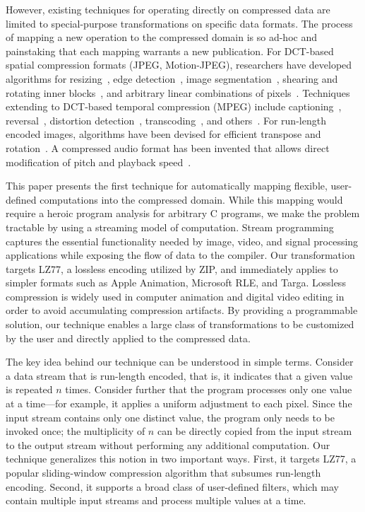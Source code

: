 However, existing techniques for operating directly on compressed data
are limited to special-purpose transformations on specific data
formats.  The process of mapping a new operation to the compressed
domain is so ad-hoc and painstaking that each mapping warrants a new
publication.  For DCT-based spatial compression formats (JPEG,
Motion-JPEG), researchers have developed algorithms for
resizing~\cite{dugad01,mukherjee02}, edge
detection~\cite{shen96,shen96b}, image segmentation~\cite{feng03},
shearing and rotating inner blocks~\cite{shen98}, and arbitrary linear
combinations of pixels~\cite{smith96b}.  Techniques extending to
DCT-based temporal compression (MPEG) include captioning~\cite{nang00},
reversal~\cite{vasudev98}, distortion detection~\cite{dorai00},
transcoding~\cite{smith98}, and others~\cite{wee02survey}.  For
run-length encoded images, algorithms have been devised for efficient
transpose and rotation~\cite{misra99,shoji95}.  A compressed audio
format has been invented that allows direct modification of pitch and
playback speed~\cite{levine98}.

This paper presents the first technique for automatically mapping
flexible, user-defined computations into the compressed domain.  While
this mapping would require a heroic program analysis for arbitrary C
programs, we make the problem tractable by using a streaming model of
computation.  Stream programming captures the essential functionality
needed by image, video, and signal processing applications while
exposing the flow of data to the compiler.  Our transformation targets
LZ77, a lossless encoding utilized by ZIP, and immediately applies to
simpler formats such as Apple Animation, Microsoft RLE, and Targa.
Lossless compression is widely used in computer animation and digital
video editing in order to avoid accumulating compression artifacts.
By providing a programmable solution, our technique enables a large
class of transformations to be customized by the user and directly
applied to the compressed data.

The key idea behind our technique can be understood in simple terms.
Consider a data stream that is run-length encoded, that is, it
indicates that a given value is repeated $n$ times.  Consider further
that the program processes only one value at a time---for example, it
applies a uniform adjustment to each pixel.  Since the input stream
contains only one distinct value, the program only needs to be invoked
once; the multiplicity of $n$ can be directly copied from the input
stream to the output stream without performing any additional
computation.  Our technique generalizes this notion in two important
ways.  First, it targets LZ77, a popular sliding-window compression
algorithm that subsumes run-length encoding.  Second, it supports a
broad class of user-defined filters, which may contain multiple input
streams and process multiple values at a time.

